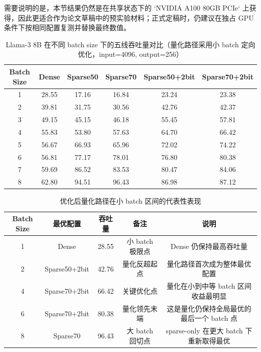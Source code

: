 需要说明的是，本节结果仍然是在共享状态下的 `NVIDIA A100 80GB PCIe` 上获得，因此更适合作为论文草稿中的预实验材料；正式定稿时，仍建议在独占 GPU 条件下按相同配置复测并替换最终数值。

\begin{table}[t]
    \centering
    \caption{Llama-3 8B 在不同 batch size 下的五线吞吐量对比（量化路径采用小 batch 定向优化，input=4096, output=256）}
    \label{tab:smallbs-quant-opt-throughput}
    \begin{tabular}{cccccc}
        \toprule
        Batch Size & Dense & Sparse50 & Sparse70 & Sparse50+2bit & Sparse70+2bit \\
        \midrule
        1 & 28.55 & 17.16 & 16.84 & 23.24 & 23.38 \\
        2 & 39.81 & 31.75 & 30.56 & 42.76 & 42.37 \\
        3 & 49.15 & 45.15 & 46.18 & 55.45 & 57.81 \\
        4 & 55.83 & 53.80 & 57.63 & 64.70 & 66.42 \\
        5 & 56.67 & 66.93 & 65.96 & 72.02 & 74.22 \\
        6 & 56.81 & 77.17 & 78.01 & 76.80 & 80.38 \\
        7 & 59.69 & 86.52 & 83.53 & 80.47 & 84.06 \\
        8 & 62.80 & 94.51 & 96.43 & 86.98 & 87.12 \\
        \bottomrule
    \end{tabular}
\end{table}

\begin{table}[t]
    \centering
    \caption{优化后量化路径在小 batch 区间的代表性表现}
    \label{tab:smallbs-quant-opt-best}
    \begin{tabular}{ccccc}
        \toprule
        Batch Size & 最优配置 & 吞吐量 & 备注 & 说明 \\
        \midrule
        1 & Dense & 28.55 & 小 batch 极限点 & Dense 仍保持最高吞吐量 \\
        2 & Sparse50+2bit & 42.76 & 量化反超起点 & 量化路径首次成为整体最优配置 \\
        4 & Sparse70+2bit & 66.42 & 关键优化点 & 量化在小到中等 batch 区间收益最明显 \\
        6 & Sparse70+2bit & 80.38 & 量化领先末端 & 这是量化仍保持全局最优的最后一个 batch 点 \\
        8 & Sparse70 & 96.43 & 大 batch 回切点 & sparse-only 在更大 batch 下重新取得最优 \\
        \bottomrule
    \end{tabular}
\end{table}

